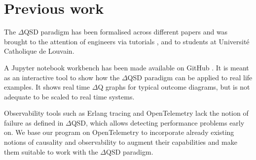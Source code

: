 \section{Previous work}
    The $\Delta$QSD paradigm has been formalised across different papers \cite{myo} \cite{art} and was brought to the attention of engineers via tutorials \cite{dq-tut}, and to students at Université Catholique de Louvain. \cite{dq-ucl} 
    
    A Jupyter notebook workbench has been made available on GitHub \cite{dqsd-wkb}. It is meant as an interactive tool to show how the $\Delta$QSD paradigm can be applied to real life examples. It shows real time $\Delta$Q graphs for typical outcome diagrams, but is not adequate to be scaled to real time systems.
    
    Observability tools such as Erlang tracing \cite{erl-t} and OpenTelemetry \cite{otel-e} lack the notion of failure as defined in $\Delta$QSD, which allows detecting performance problems early on. We base our program on OpenTelemetry to incorporate already existing notions of causality and observability to augment their capabilities and make them suitable to work with the $\Delta$QSD paradigm.
